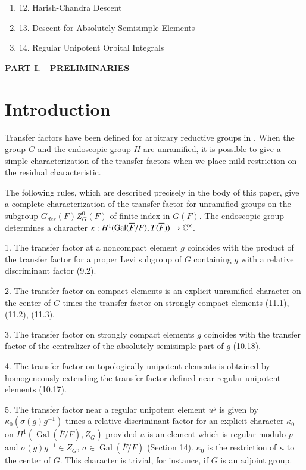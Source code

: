 \documentclass{amsart}
\def\Gal{\operatorname{\text{Gal}}}          %
\def\Com{{\Bbb C}}                         %
\def\LANGLANDSO{21}
\begin{document}
\begin{enumerate}[label=]
\item{12.}  Harish-Chandra Descent
\item{13.}  Descent for Absolutely Semisimple Elements
\item{14.}  Regular Unipotent Orbital Integrals
\end{enumerate}
\vfil\eject

\centerline{\bf PART I.\ \  PRELIMINARIES}\vskip3pc
\section{Introduction} %

Transfer factors have been defined for arbitrary
reductive groups in \cite{\LANGLANDSO}. When the group $G$ and the endoscopic
group $H$
are unramified, it is possible to give a simple
characterization of the transfer factors when we place
mild restriction on the residual characteristic.

The following rules, which are described precisely in the body of this
paper, give a complete characterization of the transfer factor for
unramified groups on the subgroup $G_{der}(F)Z_G^0(F)$ of finite
index in $G(F)$.
The endoscopic group determines a character
$\kappa:H^1(\Gal(\overline F/F),T(\overline F))\to \Com^\times$.

{1.} The transfer factor at a noncompact 
element $g$ coincides with the product of the transfer factor for a proper
Levi subgroup of $G$ containing $g$ with a relative discriminant factor (9.2).

{2.} The transfer factor on compact elements is an explicit
unramified character on the center of
$G$ times the transfer factor on strongly compact elements (11.1), (11.2), (11.3).

{3.}  The transfer factor on strongly compact 
elements $g$ coincides with the transfer factor of
the centralizer of the absolutely semisimple part of $g$ (10.18).

{4.} The transfer factor on topologically unipotent elements
is obtained by homogeneously extending the transfer
factor defined near regular unipotent elements (10.17).

{5.}  The transfer factor near a regular unipotent element
$u^g$ is given by $\kappa_0(\sigma(g)g^{-1})$ times a relative discriminant
factor for an
explicit character $\kappa_0$ on $H^1(\Gal(\overline F/F),Z_G)$
provided $u$ is an element which is regular modulo $p$ and
$\sigma(g)g^{-1}\in Z_G$, $\sigma\in\Gal(\overline F/F)$ (Section 14).
$\kappa_0$ is the restriction of $\kappa$ to the center of $G$.
This character is trivial, for instance, if $G$ is an adjoint group.
\end{document}
